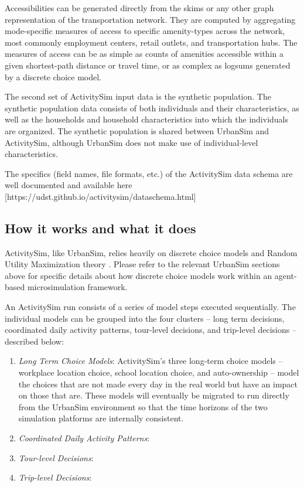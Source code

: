 Accessibilities can be generated directly from the skims or any other graph representation of the transportation network. They are computed by aggregating mode-specific measures of access to specific amenity-types across the network, most commonly employment centers, retail outlets, and transportation hubs. The measures of access can be as simple as counts of amenities accessible within a given shortest-path distance or travel time, or as complex as logsums generated by a discrete choice model. 

The second set of ActivitySim input data is the synthetic population. The synthetic population data consists of both individuals and their characteristics, as well as the households and household characteristics into which the individuals are organized. The synthetic population is shared between UrbanSim and ActivitySim, although UrbanSim does not make use of individual-level characteristics. 

The specifics (field names, file formats, etc.) of the ActivitySim data schema are well documented and available here [https://udst.github.io/activitysim/dataschema.html]

\subsection{How it works and what it does}
ActivitySim, like UrbanSim, relies heavily on discrete choice models and Random Utility Maximization theory \citep{mcfadden-1974}. Please refer to the relevant UrbanSim sections above for specific details about how discrete choice models work within an agent-based microsimulation framework.

An ActivitySim run consists of a series of model steps executed sequentially. The individual models can be grouped into the four clusters -- long term decisions, coordinated daily activity patterns, tour-level decisions, and trip-level decisions -- described below:
\begin{enumerate}[label=(\roman*)]
    \item \textit{Long Term Choice Models}: ActivitySim's three long-term choice models -- workplace location choice, school location choice, and auto-ownership -- model the choices that are not made every day in the real world but have an impact on those that are. These models will eventually be migrated to run directly from the UrbanSim environment so that the time horizons of the two simulation platforms are internally consistent.
    \item \textit{Coordinated Daily Activity Patterns}: 
    \item \textit{Tour-level Decisions}:
    \item \textit{Trip-level Decisions}:
\end{enumerate}

